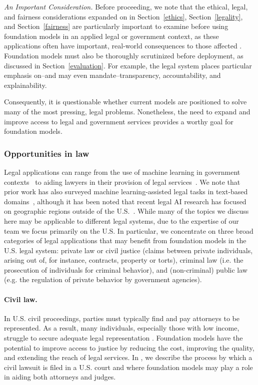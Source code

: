 \emph{An Important Consideration.} Before proceeding, we note that the ethical, legal, and fairness considerations expanded on in Section~\ref{ethics}, Section~\ref{legality}, and Section~\ref{fairness} are particularly important to examine before using foundation models in an applied legal or government context, as these applications often have important, real-world consequences to those affected \citep{surden2020ethics}. Foundation models must also be thoroughly scrutinized before deployment, as discussed in Section~\ref{evaluation}.
For example, the legal system places particular emphasis on--and may even mandate--transparency, accountability, and explainability.

Consequently, it is questionable whether current models are positioned to solve many of the most pressing, legal problems. Nonetheless, the need to expand and improve access to legal and government services provides a worthy goal for foundation models.  

\subsubsection{Opportunities in law}

Legal applications can range from the use of machine learning in government contexts~\citep{engstrom2020government,coglianese2020ai,re2019developing} to aiding lawyers in their provision of legal services~\citep{zheng2021does,huang2021context,ostendorff2021evaluating,vold2021using}. We note that prior work has also surveyed machine learning-assisted legal tasks in text-based domains~\citep{zhong2020does, chalkidis2020legal}, although it has been noted that recent legal AI research has focused on geographic regions outside of the U.S.~\citep{zheng2021does}. While many of the topics we discuss here may be applicable to different legal systems, due to the expertise of our team we focus primarily on the U.S. In particular, we concentrate on three broad categories of legal applications that may benefit from foundation models in the U.S. legal system: private law or civil justice (claims between private individuals, arising out of, for instance, contracts, property or torts), criminal law (i.e. the prosecution of individuals for criminal behavior), and (non-criminal) public law (e.g. the regulation of private behavior by government agencies).

\paragraph{Civil law.} In U.S. civil proceedings, parties must typically find and pay attorneys to be represented. As a result, many individuals, especially those with low income, struggle to secure adequate legal representation \citep{rhode2004access}. Foundation models have the potential to improve access to justice by reducing the cost, improving the quality, and extending the reach of legal services. In , we describe the process by which a civil lawsuit is filed in a U.S. court and where foundation models may play a role in aiding both attorneys and judges. 

